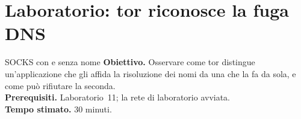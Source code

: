 \section{Laboratorio: tor riconosce la fuga DNS}\label{sec:lab-opsec}

\begin{laboratorio}[18]{SOCKS con e senza nome}
\textbf{Obiettivo.} Osservare come tor distingue un'applicazione che gli affida la risoluzione dei nomi da una che la fa da sola, e come può rifiutare la seconda.\\
\textbf{Prerequisiti.} Laboratorio~11; la rete di laboratorio avviata.\\
\textbf{Tempo stimato.} 30 minuti.
\end{laboratorio}

